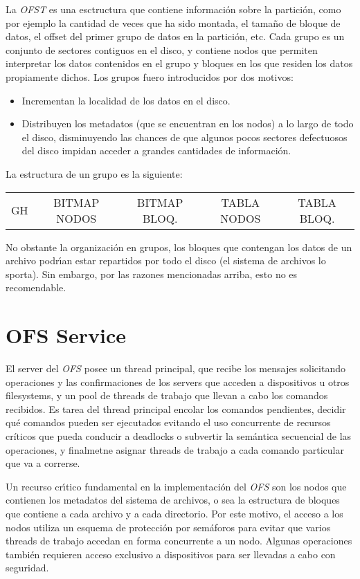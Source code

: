\documentclass[11pt, letterpaper, twoside]{book}
\begin{document}
La \emph{OFST} es una esctructura que contiene informaci\'on sobre la partici\'on, como por ejemplo la cantidad de veces que ha sido montada, el tama\~no de bloque de datos, el offset del primer grupo de datos en la partici\'on, etc. Cada grupo es un conjunto de sectores contiguos en el disco, y contiene nodos que permiten interpretar los datos contenidos en el grupo y bloques en los que residen los datos propiamente dichos. Los grupos fuero introducidos por dos motivos:
\begin{itemize}
\item Incrementan la localidad de los datos en el disco.
\item Distribuyen los metadatos (que se encuentran en los nodos) a lo largo de todo el disco, disminuyendo las chances de que algunos pocos sectores defectuosos del disco impidan acceder a grandes cantidades de informaci\'on.
\end{itemize}
La estructura de un grupo es la siguiente:
\begin{center}
\begin{tabular}{c|c|c|c|c}
GH & BITMAP NODOS & BITMAP BLOQ. & TABLA NODOS & TABLA BLOQ.
\end{tabular}
\end{center}
No obstante la organizaci\'on en grupos, los bloques que contengan los datos de un archivo podr\'\i{}an estar repartidos por todo el disco (el sistema de archivos lo sporta). Sin embargo, por las razones mencionadas arriba, esto no es recomendable.

\section{OFS Service}

El server del \emph{OFS} posee un thread principal, que recibe los mensajes solicitando operaciones y las confirmaciones de los servers que acceden a dispositivos u otros filesystems, y un pool de threads de trabajo que llevan a cabo los comandos recibidos. Es tarea del thread principal encolar los comandos pendientes, decidir qu\'e comandos pueden ser ejecutados evitando el uso concurrente de recursos cr\'iticos que pueda conducir a deadlocks o subvertir la sem\'antica secuencial de las operaciones, y finalmetne asignar threads de trabajo a cada comando particular que va a correrse.

Un recurso cr\'\i{}tico fundamental en la implementaci\'on del \emph{OFS} son los nodos que contienen los metadatos del sistema de archivos, o sea la estructura de bloques que contiene a cada archivo y a cada directorio. Por este motivo, el acceso a los nodos utiliza un esquema de protecci\'on por sem\'aforos para evitar que varios threads de trabajo accedan en forma concurrente a un nodo. Algunas operaciones tambi\'en requieren acceso exclusivo a dispositivos para ser llevadas a cabo con seguridad.
\end{document}
